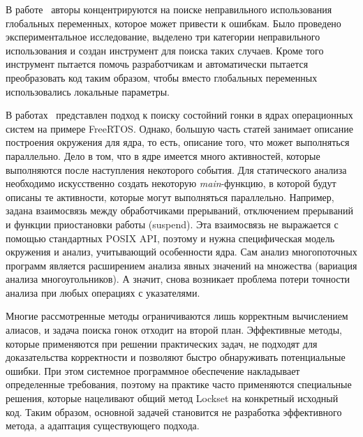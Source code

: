 В работе~\cite{Smith:2011:LGS} авторы концентрируются на поиске неправильного использования глобальных переменных, которое может привести к ошибкам.
Было проведено экспериментальное исследование, выделено три категории неправильного использования и создан инструмент для поиска таких случаев.
Кроме того инструмент пытается помочь разработчикам и автоматически пытается преобразовать код таким образом, чтобы вместо глобальных переменных использовались локальные параметры.


В работах~\cite{FreeRTOS,RacesFreeRtos} представлен подход к поиску состойний гонки в ядрах операционных систем на примере FreeRTOS. 
Однако, большую часть статей занимает описание построения окружения для ядра, то есть, описание того, что может выполняться параллельно. 
Дело в том, что в ядре имеется много активностей, которые выполняются после наступления некоторого события. 
Для статического анализа необходимо искусственно создать некоторую \textit{main}-функцию, в которой будут описаны те активности, которые могут выполняться параллельно. 
Например, задана взаимосвязь между обработчиками прерываний, отключением прерываний и функции приостановки работы (suspend). 
Эта взаимосвязь не выражается с помощью стандартных POSIX API, поэтому и нужна специфическая модель окружения и анализ, учитывающий особенности ядра. 
Сам анализ многопоточных программ является расширением анализа явных значений на множества (вариация анализа многоугольников).
А значит, снова возникает проблема потери точности анализа при любых операциях с указателями.

Многие рассмотренные методы ограничиваются лишь корректным вычислением алиасов, и задача поиска гонок отходит на второй план.
Эффективные методы, которые применяются при решении практических задач, не подходят для доказательства корректности и позволяют быстро обнаруживать потенциальные ошибки.
При этом системное программное обеспечение накладывает определенные требования, поэтому на практике часто применяются специальные решения, которые нацеливают общий метод Lockset на конкретный исходный код.
Таким образом, основной задачей становится не разработка эффективного метода, а адаптация существующего подхода.

